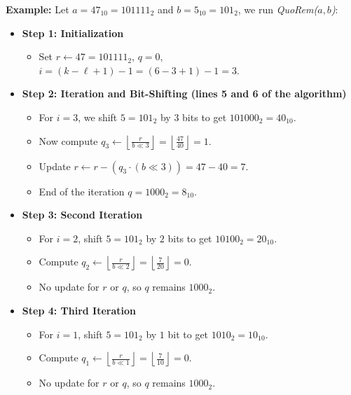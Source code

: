 \noindent
\textbf{Example:} Let $a = 47_10 = 101111_2$ and $b = 5_10 = 101_2$, we run \textit{QuoRem($a,b$)}:

\begin{itemize}
    \item \textbf{Step 1: Initialization}
    \begin{itemize}
        \item Set $r \gets 47 = 101111_2$, $q = 0$, $i = (k-\ell +1) - 1 = (6-3+1) - 1 = 3$. 
    \end{itemize}
    
    \item \textbf{Step 2: Iteration and Bit-Shifting (lines 5 and 6 of the algorithm)}
    \begin{itemize}
        \item For $i = 3$, we shift $5 = 101_2$ by $3$ bits to get $101000_2 = 40_{10}$.
        \item Now compute $q_3 \gets \left\lfloor \frac{r}{b \ll 3} \right\rfloor = \left\lfloor \frac{47}{40} \right\rfloor = 1$.
        \item Update $r \gets r - (q_3 \cdot (b \ll 3)) = 47 - 40 = 7$.
        \item End of the iteration $q = 1000_2 = 8_{10}$.
    \end{itemize}
    
    \item \textbf{Step 3: Second Iteration}
    \begin{itemize}
        \item For $i = 2$, shift $5 = 101_2$ by $2$ bits to get $10100_2 = 20_{10}$.
        \item Compute $q_2 \gets \left\lfloor \frac{r}{b \ll 2} \right\rfloor = \left\lfloor \frac{7}{20} \right\rfloor = 0$.
        \item No update for $r$ or $q$, so $q$ remains $1000_2$.
    \end{itemize}
    
    \item \textbf{Step 4: Third Iteration}
    \begin{itemize}
        \item For $i = 1$, shift $5 = 101_2$ by $1$ bit to get $1010_2 = 10_{10}$.
        \item Compute $q_1 \gets \left\lfloor \frac{r}{b \ll 1} \right\rfloor = \left\lfloor \frac{7}{10} \right\rfloor = 0$.
        \item No update for $r$ or $q$, so $q$ remains $1000_2$.
    \end{itemize}
    

\end{itemize}
